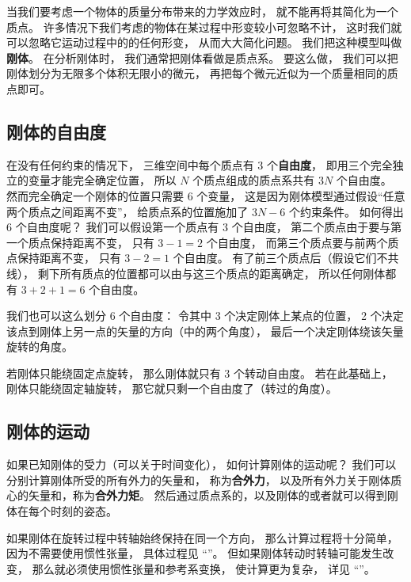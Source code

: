 

当我们要考虑一个物体的质量分布带来的力学效应时， 就不能再将其简化为一个质点。 许多情况下我们考虑的物体在某过程中形变较小可忽略不计， 这时我们就可以忽略它运动过程中的的任何形变， 从而大大简化问题。 我们把这种模型叫做\textbf{刚体}。 在分析刚体时， 我们通常把刚体看做是质点系。 要这么做， 我们可以把刚体划分为无限多个体积无限小的微元， 再把每个微元近似为一个质量相同的质点即可。 

\subsection{刚体的自由度}

在没有任何约束的情况下， 三维空间中每个质点有 3 个\textbf{自由度}， 即用三个完全独立的变量才能完全确定位置， 所以 $N$ 个质点组成的质点系共有 $3N$ 个自由度。 然而完全确定一个刚体的位置只需要 6 个变量， 这是因为刚体模型通过假设“任意两个质点之间距离不变”， 给质点系的位置施加了 $3N - 6$ 个约束条件。 如何得出 6 个自由度呢？ 我们可以假设第一个质点有 3 个自由度， 第二个质点由于要与第一个质点保持距离不变， 只有 $3 - 1 = 2$ 个自由度， 而第三个质点要与前两个质点保持距离不变， 只有 $3 - 2 = 1$ 个自由度。 有了前三个质点后（假设它们不共线）， 剩下所有质点的位置都可以由与这三个质点的距离确定， 所以任何刚体都有 $3 + 2 + 1 = 6$ 个自由度。

我们也可以这么划分 6 个自由度： 令其中 3 个决定刚体上某点的位置， 2 个决定该点到刚体上另一点的矢量的方向（中的两个角度）， 最后一个决定刚体绕该矢量旋转的角度。

若刚体只能绕固定点旋转， 那么刚体就只有 3 个转动自由度。 若在此基础上， 刚体只能绕固定轴旋转， 那它就只剩一个自由度了（转过的角度）。

\subsection{刚体的运动}
如果已知刚体的受力（可以关于时间变化）， 如何计算刚体的运动呢？ 我们可以分别计算刚体所受的所有外力的矢量和， 称为\textbf{合外力}， 以及所有外力关于刚体质心的矢量和，称为\textbf{合外力矩}。 然后通过质点系的，以及刚体的或者就可以得到刚体在每个时刻的姿态。

如果刚体在旋转过程中转轴始终保持在同一个方向， 那么计算过程将十分简单， 因为不需要使用惯性张量， 具体过程见 “”。 但如果刚体转动时转轴可能发生改变， 那么就必须使用惯性张量和参考系变换， 使计算更为复杂， 详见 “”。
